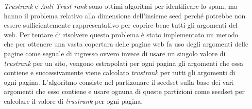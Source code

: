 \textit{Trustrank} e \textit{Anti-Trust rank} sono ottimi algoritmi per identificare lo spam, ma hanno il problema relativo alla dimensione dell’insieme  seed perché potrebbe non essere sufficientemente rappresentativo per coprire bene tutti gli argomenti del web. Per tentare di risolvere questo problema è stato implementato un metodo \cite{Wu:2006:TTU:1135777.1135792}  che per ottenere una vasta copertara delle pagine web fa uso degli argomenti delle pagine come segnale di ingresso ovvero invece di usare un singolo valore di \textit{trustrank} per un sito, vengono estrapolati per ogni pagina gli argomenti che essa contiene e successivamente viene calcolato \textit{trustrank} per tutti gli argomenti di ogni pagina. L'algoritmo consiste nel partizonare il seedset sulla base dei vari argomenti che esso contiene e usare ognuna di queste partizioni come seedset per calcolare il valore di \textit{trustrank} per ogni pagina.

